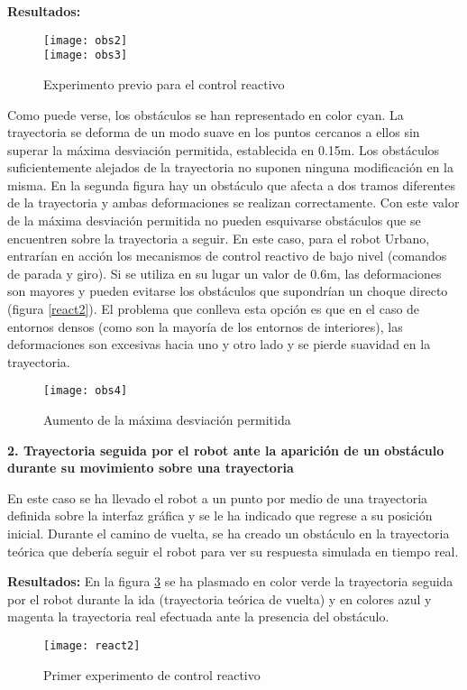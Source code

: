 \textbf{Resultados:}
\begin{figure}[h]
  \centering\texttt{[image: obs2]}\\
  \hspace{0.5cm}\texttt{[image: obs3]}
  \caption{Experimento previo para el control reactivo}\label{fg:react1}
\end{figure}


Como puede verse, los obstáculos se han representado en color cyan. La trayectoria se deforma de un modo suave en los puntos cercanos a ellos sin superar la máxima desviación permitida, establecida en 0.15m. Los obstáculos suficientemente alejados de la trayectoria no suponen ninguna modificación en la misma. En la segunda figura hay un obstáculo que afecta a dos tramos diferentes de la trayectoria y ambas deformaciones se realizan correctamente. Con este valor de la máxima desviación permitida no pueden esquivarse obstáculos que se encuentren sobre la trayectoria a seguir. En este caso, para el robot Urbano, entrarían en acción los mecanismos de control reactivo de bajo nivel (comandos de parada y giro). Si se utiliza en su lugar un valor de 0.6m, las deformaciones son mayores y pueden evitarse los obstáculos que supondrían un choque directo (figura \ref{react2}). El problema que conlleva esta opción es que en el caso de entornos densos (como son la mayoría de los entornos de interiores), las deformaciones son excesivas hacia uno y otro lado y se pierde suavidad en la trayectoria.
\begin{figure}[h]
  \centering\texttt{[image: obs4]}\\
  \caption{Aumento de la máxima desviación permitida}\label{fg:react2}
\end{figure}


\noindent
\textbf{\textbf{2.} Trayectoria seguida por el robot ante la aparición de un obstáculo durante su movimiento sobre una trayectoria}

En este caso se ha llevado el robot a un punto por medio de una trayectoria definida sobre la interfaz gráfica y se le ha indicado que regrese a su posición inicial. Durante el camino de vuelta, se ha creado un obstáculo en la trayectoria teórica que debería seguir el robot para ver su respuesta simulada en tiempo real.

\textbf{Resultados:}
En la figura \ref{fg:react3} se ha plasmado en color verde la trayectoria seguida por el robot durante la ida (trayectoria teórica de vuelta) y en colores azul y magenta la trayectoria real efectuada ante la presencia del obstáculo.
\begin{figure}[h]
  \centering\texttt{[image: react2]}\\
  \caption{Primer experimento de control reactivo}\label{fg:react3}
\end{figure}


